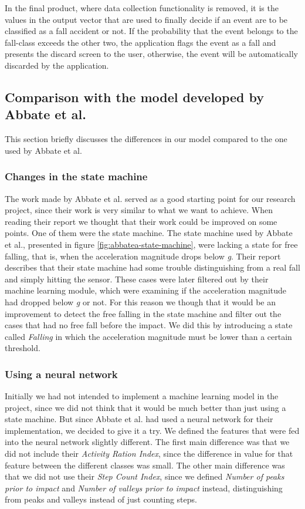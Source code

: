 \documentclass[12pt, a4paper, onecolumn]{article}
\begin{document}
	In the final product, where data collection functionality is removed, it is the values in the output vector that are used to finally decide if an event are to be classified as a fall accident or not. If the probability that the event belongs to the fall-class exceeds the other two, the application flags the event as a fall and presents the discard screen to the user, otherwise, the event will be automatically discarded by the application. 
	
	
	\subsection{Comparison with the model developed by Abbate et al.}
	
	This section briefly discusses the differences in our model compared to the one used by Abbate et al.
	
	\subsubsection{Changes in the state machine}
	
	The work made by Abbate et al. served as a good starting point for our research project, since their work is very similar to what we want to achieve. When reading their report we thought that their work could be improved on some points. One of them were the state machine. The state machine used by Abbate et al., presented in figure \ref{fig:abbatea-state-machine}, were lacking a state for free falling, that is, when the acceleration magnitude drops below \textit{g}. Their report describes that their state machine had some trouble distinguishing from a real fall and simply hitting the sensor. These cases were later filtered out by their machine learning module, which were examining if the acceleration magnitude had dropped below \textit{g} or not. For this reason we though that it would be an improvement to detect the free falling in the state machine and filter out the cases that had no free fall before the impact. We did this by introducing a state called \textit{Falling} in which the acceleration magnitude must be lower than a certain threshold.
	
	\subsubsection{Using a neural network}
	
	Initially we had not intended to implement a machine learning model in the project, since we did not think that it would be much better than just using a state machine. But since Abbate et al. had used a neural network for their implementation, we decided to give it a try. We defined the features that were fed into the neural network slightly different. The first main difference was that we did not include their \textit{Activity Ration Index}, since the difference in value for that feature between the different classes was small. The other main difference was that we did not use their \textit{Step Count Index}, since we defined \textit{Number of peaks prior to impact} and \textit{Number of valleys prior to impact} instead, distinguishing from peaks and valleys instead of just counting steps. 
	
\end{document}
